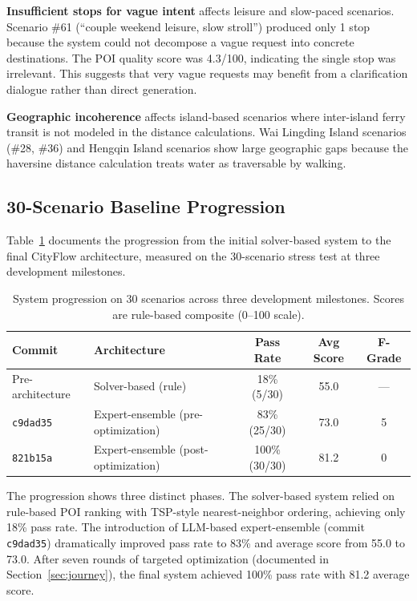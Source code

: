 \textbf{Insufficient stops for vague intent} affects leisure and slow-paced scenarios. Scenario \#61 (``couple weekend leisure, slow stroll'') produced only 1 stop because the system could not decompose a vague request into concrete destinations. The POI quality score was 4.3/100, indicating the single stop was irrelevant. This suggests that very vague requests may benefit from a clarification dialogue rather than direct generation.

\textbf{Geographic incoherence} affects island-based scenarios where inter-island ferry transit is not modeled in the distance calculations. Wai Lingding Island scenarios (\#28, \#36) and Hengqin Island scenarios show large geographic gaps because the haversine distance calculation treats water as traversable by walking.

\subsection{30-Scenario Baseline Progression}

Table~\ref{tab:comparison} documents the progression from the initial solver-based system to the final CityFlow architecture, measured on the 30-scenario stress test at three development milestones.

\begin{table}[H]
\centering
\caption{System progression on 30 scenarios across three development milestones. Scores are rule-based composite (0--100 scale).}
\label{tab:comparison}
\begin{tabular}{@{}llccc@{}}
\toprule
\textbf{Commit} & \textbf{Architecture} & \textbf{Pass Rate} & \textbf{Avg Score} & \textbf{F-Grade} \\
\midrule
Pre-architecture & Solver-based (rule) & 18\% (5/30) & 55.0 & --- \\
\texttt{c9dad35} & Expert-ensemble (pre-optimization) & 83\% (25/30) & 73.0 & 5 \\
\texttt{821b15a} & Expert-ensemble (post-optimization) & 100\% (30/30) & 81.2 & 0 \\
\bottomrule
\end{tabular}
\end{table}

The progression shows three distinct phases. The solver-based system relied on rule-based POI ranking with TSP-style nearest-neighbor ordering, achieving only 18\% pass rate. The introduction of LLM-based expert-ensemble (commit \texttt{c9dad35}) dramatically improved pass rate to 83\% and average score from 55.0 to 73.0. After seven rounds of targeted optimization (documented in Section~\ref{sec:journey}), the final system achieved 100\% pass rate with 81.2 average score.

